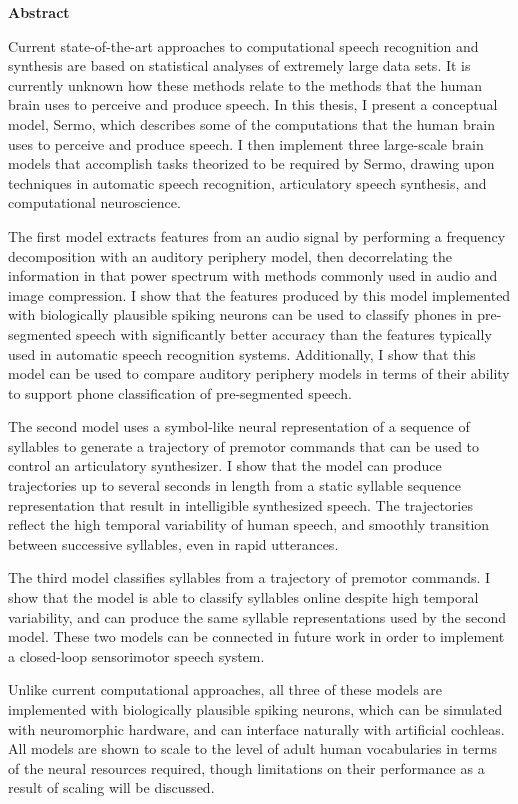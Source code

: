 \begin{center}\textbf{Abstract}\end{center}

Current state-of-the-art approaches
to computational
speech recognition and synthesis
are based on statistical analyses
of extremely large data sets.
It is currently unknown how these methods
relate to the methods that the human brain
uses to perceive and produce speech.
In this thesis,
I present a conceptual model, Sermo,
which describes some of the computations that
the human brain uses to
perceive and produce speech.
I then implement three large-scale brain models
that accomplish tasks
theorized to be required by Sermo,
drawing upon techniques
in automatic speech recognition,
articulatory speech synthesis,
and computational neuroscience.

The first model extracts features
from an audio signal by
performing a frequency decomposition
with an auditory periphery model,
then decorrelating the information
in that power spectrum
with methods commonly used in
audio and image compression.
I show that the features produced
by this model implemented
with biologically plausible spiking neurons
can be used to classify phones in
pre-segmented speech with significantly
better accuracy than the features
typically used in
automatic speech recognition systems.
Additionally, I show that this model
can be used to compare auditory periphery models
in terms of their ability to
support phone classification of pre-segmented speech.

The second model
uses a symbol-like neural representation
of a sequence of syllables
to generate a trajectory of premotor commands
that can be used to control
an articulatory synthesizer.
I show that the model
can produce trajectories
up to several seconds in length
from a static syllable sequence representation
that result in
intelligible synthesized speech.
The trajectories reflect the
high temporal variability
of human speech,
and smoothly transition between
successive syllables,
even in rapid utterances.

The third model
classifies syllables
from a trajectory of premotor commands.
I show that the model is able to
classify syllables online
despite high temporal variability,
and can produce the same
syllable representations
used by the second model.
These two models can be connected
in future work in order to implement
a closed-loop sensorimotor speech system.

Unlike current computational approaches,
all three of these models are implemented
with biologically plausible spiking neurons,
which can be simulated with neuromorphic hardware,
and can interface naturally with artificial cochleas.
All models are shown to scale
to the level of adult human vocabularies
in terms of the neural resources required,
though limitations on their performance
as a result of scaling will be discussed.

\cleardoublepage
